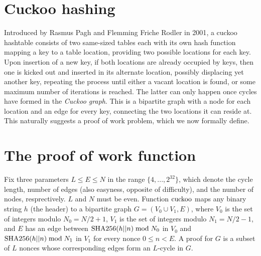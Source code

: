 \documentclass[11pt, oneside]{article}
\newcommand{\cuckoo}{{\rm cuckoo}}
\newcommand{\sha}{{\rm SHA256}}
\begin{document}
\section{Cuckoo hashing}
Introduced by Rasmus Pagh and Flemming Friche Rodler in
2001\cite{Pagh01cuckoohashing}, a cuckoo hashtable consists of two same-sized
tables each with its own hash function mapping a key to a table location,
providing two possible locations for each key.
Upon insertion of a new key, if both locations are already occupied by keys,
then one is kicked out and inserted in its alternate location, possibly
displacing yet another key, repeating the process until either a vacant
location is found, or some maximum number of iterations is reached.
The latter can only happen once cycles have formed in the {\em Cuckoo graph}.
This is a bipartite graph with a node for each location and an
edge for every key, connecting the two locations it can reside at.
This naturally suggests a proof of work problem, which we now formally define.

\section{The proof of work function}
Fix three parameters $L \leq E \leq N$ in the range $\{4,...,2^{32}\}$, which
denote the cycle length, number of edges (also easyness, opposite of difficulty),
and the number of nodes, resprectively. $L$ and $N$ must be even.
Function $\cuckoo$ maps any binary string $h$ (the header) to a bipartite graph
$G = (V_0 \cup V_1, E)$, where $V_0$ is the set of integers modulo $N_0=N/2+1$,
$V_1$ is the set of integers modulo $N_1=N/2-1$, and $E$ has an edge between
$\sha(h||n) \bmod N_0$ in $V_0$ and $\sha(h||n) \bmod N_1$ in $V_1$ for every
nonce $0 \leq n < E$. A proof for $G$ is a subset of $L$ nonces whose
corresponding edges form an $L$-cycle in $G$.
\end{document}

